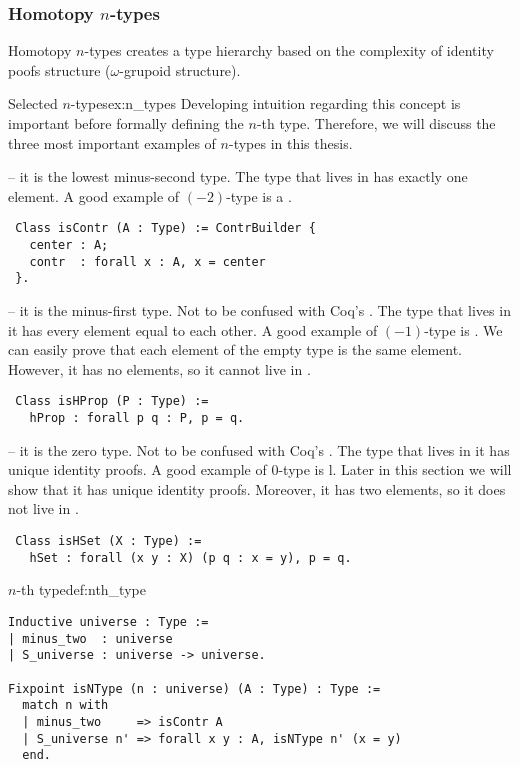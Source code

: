 \subsubsection{Homotopy $n$-types}
Homotopy $n$-types creates a type hierarchy based on the complexity of identity poofs structure ($\omega$-grupoid structure).
\begin{example}{Selected $n$-types}{ex:n_types}
Developing intuition regarding this concept is important before formally defining the $n$-th type. Therefore, we will discuss the three most important examples of $n$-types in this thesis.
\begin{description}
    \item {} -- it is the lowest minus-second type. The type that lives in  has exactly one element. A good example of $(-2)$-type is a .
    \begin{verbatim}
 Class isContr (A : Type) := ContrBuilder {
   center : A;
   contr  : forall x : A, x = center
 }.
    \end{verbatim}
    \item {} -- it is the minus-first type. Not to be confused with Coq's . The type that lives in it has every element equal to each other. A good example of $(-1)$-type is . We can easily prove that each element of the empty type is the same element. However, it has no elements, so it cannot live in .
        \begin{verbatim}
 Class isHProp (P : Type) :=
   hProp : forall p q : P, p = q.
    \end{verbatim}
    \item {} -- it is the zero type. Not to be confused with Coq's . The type that lives in it has unique identity proofs. A good example of $0$-type is l. Later in this section we will show that it has unique identity proofs. Moreover, it has two elements, so it does not live in .
    \begin{verbatim}
 Class isHSet (X : Type) :=
   hSet : forall (x y : X) (p q : x = y), p = q.
    \end{verbatim}
\end{description}
\end{example}
\begin{defi}{$n$-th type}{def:nth_type}
\begin{verbatim}
Inductive universe : Type :=
| minus_two  : universe
| S_universe : universe -> universe.

Fixpoint isNType (n : universe) (A : Type) : Type :=
  match n with
  | minus_two     => isContr A
  | S_universe n' => forall x y : A, isNType n' (x = y)
  end.
\end{verbatim}
\end{defi}

